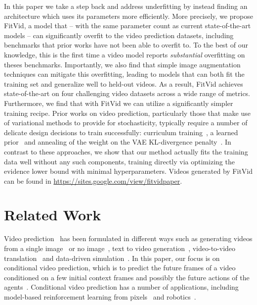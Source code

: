 \documentclass{article}
\newcommand{\model}{FitVid\xspace}
\newcommand{\website}{\url{https://sites.google.com/view/fitvidpaper}\xspace}
\begin{document}
In this paper we take a step back and address underfitting by instead finding an architecture which uses its parameters more efficiently. More precisely, we propose \model, a model that -- with the same parameter count as current state-of-the-art models -- can significantly overfit to the video prediction datasets, including benchmarks that prior works have not been able to overfit to. To the best of our knowledge, this is the first time a video model reports \textit{substantial} overfitting on theses benchmarks. Importantly, we also find that simple image augmentation techniques can mitigate this overfitting, leading to models that can both fit the training set and generalize well to held-out videos. As a result, \model achieves state-of-the-art on four challenging video datasets across a wide range of metrics. Furthermore, we find that with \model we can utilize a significantly simpler training recipe. Prior works on video prediction, particularly those that make use of variational methods to provide for stochasticity, typically require a number of delicate design decisions to train successfully: curriculum training~\cite{oh2015action, finn2016unsupervised, lee2018stochastic, cenzato2019difficulty}, a learned prior~\cite{denton2018stochastic,villegas2019high,castrejon2019improved} and annealing of the weight on the VAE KL-divergence penalty~\cite{babaeizadeh2017stochastic}. In contrast to these approaches, we show that our method actually fits the training data well without any such components, training directly via optimizing the evidence lower bound with minimal hyperparameters. Videos generated by \model can be found in \website.







\vspace{-0.4cm}
\section{Related Work}
\vspace{-0.2cm}
Video prediction~\cite{ranzato2014video,srivastava2015unsupervised} has been formulated in different ways such as generating videos from a single image~\cite{endo2019animating, nam2019end, dorkenwald2021stochastic, yang2021dual, hu2021learning} or no image~\cite{vondrick2016generating,saito2018tganv2,clark2019adversarial}, text to video generation~\cite{godiva}, video-to-video translation~\cite{wang2019few, wang2018video} and data-driven simulation~\cite{kaiser2019model, drivegan, kim2020learning}. In this paper, our focus is on conditional video prediction, which is to predict the future frames of a video conditioned on a few initial context frames and possibly the future actions of the agents~\cite{finn2016unsupervised, babaeizadeh2017stochastic}. Conditional video prediction has a number of applications, including model-based reinforcement learning from pixels~\cite{hafner2018learning, hafner2019dream, kaiser2019model,rafailov2020offline} and
robotics~\cite{boots2014learning,finn2017deep,kalchbrenner2017video,ebert2017self,ebert2018robustness,ebert2018visual,xie2019improvisation,paxton2019visual,nair2019hierarchical,nair2020trass}.
\end{document}
